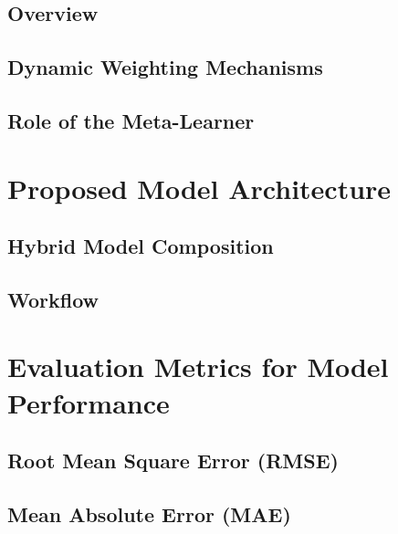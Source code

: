 \subsection{Overview} %
\subsection{Dynamic Weighting Mechanisms} %
\subsection{Role of the Meta-Learner} %


\section{Proposed Model Architecture} 
\subsection{Hybrid Model Composition} %
\subsection{Workflow} %


\section{Evaluation Metrics for Model Performance}
\subsection{Root Mean Square Error (RMSE)} %
\subsection{Mean Absolute Error (MAE)} %


